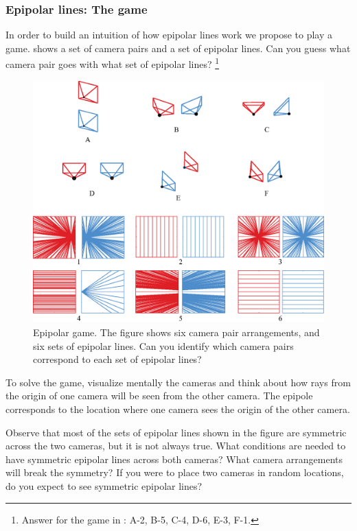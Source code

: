 \subsubsection{Epipolar lines: The game}
In order to build an intuition of how epipolar lines work we propose to play a game.
\Fig{\ref{fig:epipolarlinesgame}} shows a set of camera pairs and a set of epipolar lines. Can you guess what camera pair goes with what set of epipolar lines? \footnote{Answer for the game in \fig{\ref{fig:epipolarlinesgame}}: A-2, B-5, C-4, D-6, E-3, F-1.}


\begin{figure}[t]
    \centerline{
        \includegraphics[width=1\linewidth]{figures/3d_scene_understanding/epipolar_game_play.eps}
    }
    \caption{Epipolar game. The figure shows six camera pair arrangements, and six sets of epipolar lines. Can you identify which camera pairs correspond to each set of epipolar lines?}
    \label{fig:epipolarlinesgame}
\end{figure}

To solve the game, visualize mentally the cameras and think about how rays from the origin of one camera will be seen from the other camera. The epipole corresponds to the location where one camera sees the origin of the other camera.

Observe that most of the sets of epipolar lines shown in the figure are symmetric across the two cameras, but it is not always true. What conditions are needed to have symmetric epipolar lines across both cameras? What camera arrangements will break the symmetry? If you were to place two cameras in random locations, do you expect to see symmetric epipolar lines?

